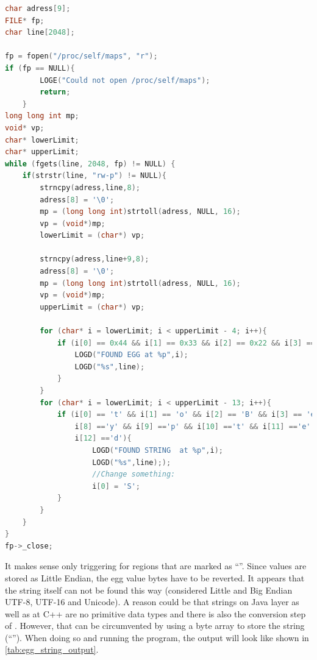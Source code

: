 \begin{lstlisting}[language=C++, caption=Egg Value and String Memory Sweep, label=egg_string_sweep]
char adress[9];
FILE* fp;
char line[2048];

fp = fopen("/proc/self/maps", "r");
if (fp == NULL){
        LOGE("Could not open /proc/self/maps");
        return;
    }
long long int mp;
void* vp;
char* lowerLimit;
char* upperLimit;
while (fgets(line, 2048, fp) != NULL) {
    if(strstr(line, "rw-p") != NULL){
        strncpy(adress,line,8);
        adress[8] = '\0';
        mp = (long long int)strtoll(adress, NULL, 16);
        vp = (void*)mp;
        lowerLimit = (char*) vp;

        strncpy(adress,line+9,8);
        adress[8] = '\0';
        mp = (long long int)strtoll(adress, NULL, 16);
        vp = (void*)mp;
        upperLimit = (char*) vp;

        for (char* i = lowerLimit; i < upperLimit - 4; i++){
            if (i[0] == 0x44 && i[1] == 0x33 && i[2] == 0x22 && i[3] == 0x11){
                LOGD("FOUND EGG at %p",i);
                LOGD("%s",line);
            }
        }
        for (char* i = lowerLimit; i < upperLimit - 13; i++){
            if (i[0] == 't' && i[1] == 'o' && i[2] == 'B' && i[3] == 'e' && i[4] == 'E' && i[5] =='n' && i[6] =='c' && i[7] =='r' &&
                i[8] =='y' && i[9] =='p' && i[10] =='t' && i[11] =='e' &&
                i[12] =='d'){
                    LOGD("FOUND STRING  at %p",i);
                    LOGD("%s",line););
                    //Change something:
                    i[0] = 'S';
            }
        }
    }
}
fp->_close;
\end{lstlisting}
It makes sense only triggering for regions that are marked as ``''.
Since values are stored as Little Endian, the egg value bytes have to be
reverted. It appears that the string itself can not be found this way
(considered Little and Big Endian UTF-8, UTF-16 and Unicode).
A reason could be that strings on Java layer as well as at C++
are no primitive data types and there is also the conversion step of .
However, that can be circumvented by using a byte array to store the string
(``'').
When doing so and running the program, the output will look like
shown in \autoref{tab:egg_string_output}.

